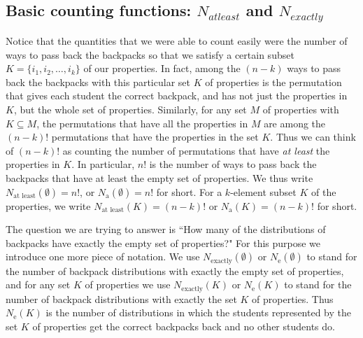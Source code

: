\documentclass[10pt,]{book}
\theoremstyle{plain}
\theoremstyle{definition}
\numberwithin{equation}{chapter}
\begin{document}
\subsection[{Basic counting functions: \(N_{ at least }\) and \(N_{ exactly }\)}]{Basic counting functions: \(N_{ at least }\) and \(N_{ exactly }\)}\label{subsection-53}
Notice that the quantities that we were able to count easily were the number of ways to pass back the backpacks so that we satisfy a certain subset \(K= \{i_1,i_2,\ldots,i_k\}\) of our properties. In fact, among the \((n-k)\) ways to pass back the backpacks with this particular set \(K\) of properties is the permutation that gives each student the correct backpack, and has not just the properties in \(K\), but the whole set of properties. Similarly, for any set \(M\) of properties with \(K\subseteq
M\), the permutations that have all the properties in \(M\) are among the \((n-k)!\) permutations that have the properties in the set \(K\). Thus we can think of \((n-k)!\) as counting the number of permutations that have \emph{at least} the properties in \(K\). In particular, \(n!\) is the number of ways to pass back the backpacks that have at least the empty set of properties. We thus write \(N_{\mbox{at least} }(\emptyset)=n!\), or \(N_{\mbox{a} }(\emptyset)=n!\) for short. For a \(k\)-element subset \(K\) of the properties, we write \(N_{\mbox{at least} }(K) =(n-k)!\) or \(N_{\mbox{a} }(K) =(n-k)!\) for short.%
\par
The question we are trying to answer is ``How many of the distributions of backpacks have exactly the empty set of properties?" For this purpose we introduce one more piece of notation. We use \(N_{\mbox{exactly} }(\emptyset)\) or \(N_{\mbox{e} }(\emptyset)\) to stand for the number of backpack distributions with exactly the empty set of properties, and for any set \(K\) of properties we use \(N_{\mbox{exactly} }(K)\) or \(N_{\mbox{e} }(K)\) to stand for the number of backpack distributions with exactly the set \(K\) of properties. Thus \(N_{\mbox{e} }(K)\) is the number of distributions in which the students represented by the set \(K\) of properties get the correct backpacks back and no other students do.%
\typeout{************************************************}
\typeout{************************************************}
\end{document}
